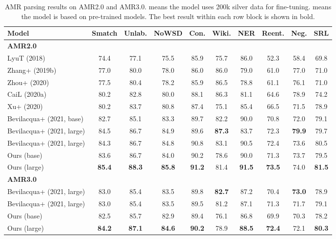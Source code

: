 \documentclass[11pt]{article}
\begin{document}
\begin{table*}[!t]
	\centering
	\small
	\begin{tabular}{l|c|cccccccc}
		\toprule
        \textbf{Model} & \textbf{Smatch} & \textbf{Unlab.}  & \textbf{NoWSD} & \textbf{Con.} &\textbf{Wiki.} & \textbf{NER} & \textbf{Reent.} & \textbf{Neg.} & \textbf{SRL}\\
		\midrule
		\textbf{AMR2.0} & & & & & & & & &\\
		LyuT (2018) &74.4 &77.1 &75.5 &85.9 &75.7 &86.0 &52.3 &58.4 &69.8 \\
		Zhang+ (2019b) &77.0 &80.0 &78.0 &86.0 &86.0 &79.0 &61.0 &77.0 &71.0 \\
		Zhou+ (2020) &77.5 &80.4 &78.2 &85.9 &86.5 &78.8 &61.1 &76.1 &71.0 \\
		CaiL (2020a) &80.2 &82.8 &80.0 &88.1 &86.3 &81.1 &64.6 &78.9 &74.2 \\
		Xu+ (2020) &80.2 &83.7 &80.8 &87.4 &75.1 &85.4 &66.5 &71.5 &78.9 \\
		Bevilacqua+ (2021, base) &82.7 &85.1 &83.3 &89.7 &82.2 &90.0 &70.8 &72.0 &79.1 \\
		Bevilacqua+ (2021, large) &84.5 &86.7 &84.9 &89.6 &\textbf{87.3} &83.7 &72.3 &\textbf{79.9} &79.7 \\
		Bevilacqua+ (2021, large) &84.3 &86.7 &84.8 &90.8 &83.1 &90.5 &72.4 &73.6 &80.5 \\
		\rowcolor{mygray}
		Ours (base) & 83.6 &86.7 &84.0 &90.2 &78.6 &90.0 &71.3 &73.7 &79.5 \\
		\rowcolor{mygray}
		Ours (large) &\textbf{85.4} &\textbf{88.3} &\textbf{85.8} &\textbf{91.2} &81.4 &\textbf{91.5} &\textbf{73.5} &74.0 &\textbf{81.5} \\
\midrule
		\textbf{AMR3.0} & & & & & & & & & \\
		Bevilacqua+ (2021, large) &83.0 &85.4 &83.5 &89.8 &\textbf{82.7} &87.2 &70.4 &\textbf{73.0} &78.9 \\
		Bevilacqua+ (2021, large) &83.0 &85.4 &83.5 &89.5 &81.2 &87.1 &71.3 &71.7 &79.1 \\
		\rowcolor{mygray}
		Ours (base) &82.5 &85.7 &82.9 &89.4 &76.1 &86.8 &69.9 &70.3 &78.2 \\
		\rowcolor{mygray}
		Ours (large) & \textbf{84.2} &\textbf{87.1} &\textbf{84.6} &\textbf{90.2} &78.9 &\textbf{88.5} &\textbf{72.4} &72.1 &\textbf{80.3} \\
\bottomrule
	\end{tabular}
	\caption{AMR parsing results on AMR2.0 and AMR3.0.  means the model uses 200k silver data for fine-tuning.  means the model is based on pre-trained models. The best result within each row block is shown in bold.}
	\label{tab:main-parsing}
\end{table*}
\end{document}
